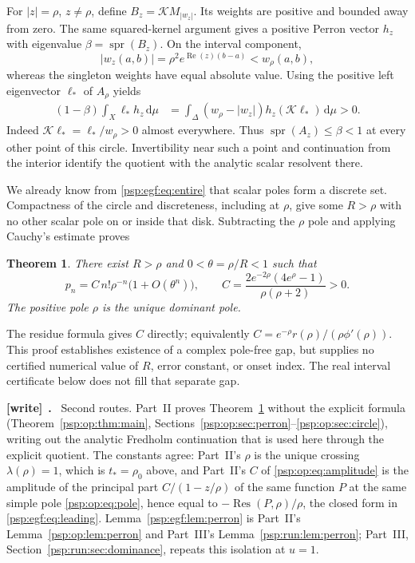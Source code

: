 \documentclass[11pt,letterpaper]{article}
\numberwithin{equation}{section}
\newtheorem{theorem}{Theorem}[section]
\theoremstyle{remark}\newtheorem{remark}[theorem]{Remark}
\newcommand{\dd}{\,\mathrm d}
\newcommand{\spr}{\operatorname{spr}}
\newcommand{\Res}{\operatorname{Res}}
\newenvironment{writenote}[1][]{\par\smallskip\begingroup\small
 \noindent\textbf{[write]}\if\relax\detokenize{#1}\relax\else~\textbf{#1.}\fi\ }%
 {\par\endgroup\smallskip}
\begin{document}
For $|z|=\rho$, $z\ne\rho$, define
$B_z=\mathcal K M_{|w_z|}$. Its weights are positive and bounded away
from zero. The same squared-kernel argument gives a positive Perron
vector $h_z$ with eigenvalue $\beta=\spr(B_z)$. On the interval component,
\[
 |w_z(a,b)|=\rho^2e^{\operatorname{Re}(z)(b-a)}<w_\rho(a,b),
\]
whereas the singleton weights have equal absolute value. Using the
positive left eigenvector $\ell_*$ of $A_\rho$ yields
\begin{align*}
 (1-\beta)\int_X\ell_*h_z\dd\mu
 &=\int_\Delta(w_\rho-|w_z|)h_z(\mathcal K\ell_*)\dd\mu>0.
\end{align*}
Indeed $\mathcal K\ell_*=\ell_*/w_\rho>0$ almost everywhere.
Thus $\spr(A_z)\leq\beta<1$ at every other point of this circle.
Invertibility near such a point and continuation from the interior
identify the quotient with the analytic scalar resolvent there.

We already know from \eqref{psp:egf:eq:entire} that scalar poles form a discrete
set. Compactness of the circle and discreteness, including at $\rho$,
give some $R>\rho$ with no other scalar pole on or inside that disk.
Subtracting the $\rho$ pole and applying Cauchy's estimate proves
\begin{theorem}\label{psp:egf:thm:leading}
There exist $R>\rho$ and $0<\theta=\rho/R<1$ such that
\begin{equation}\label{psp:egf:eq:leading}
 p_n=C\,n!\rho^{-n}\bigl(1+O(\theta^n)\bigr),\qquad
 C=\frac{2e^{-2\rho}(4e^\rho-1)}{\rho(\rho+2)}>0.
\end{equation}
The positive pole $\rho$ is the unique dominant pole.
\end{theorem}
The residue formula gives $C$ directly; equivalently
$C=e^{-\rho}r(\rho)/(\rho\phi'(\rho))$.
This proof establishes existence of a complex pole-free gap, but supplies
no certified numerical value of $R$, error constant, or onset index.
The real interval certificate below does not fill that separate gap.
\begin{writenote}
Second routes. Part~II proves Theorem~\ref{psp:egf:thm:leading} without the explicit formula (Theorem~\ref{psp:op:thm:main}, Sections~\ref{psp:op:sec:perron}--\ref{psp:op:sec:circle}), writing out the analytic Fredholm continuation that is used here through the explicit quotient. The constants agree: Part~II's $\rho$ is the unique crossing $\lambda(\rho)=1$, which is $t_*=\rho_0$ above, and Part~II's $C$ of \eqref{psp:op:eq:amplitude} is the amplitude of the principal part $C/(1-z/\rho)$ of the same function $P$ at the same simple pole \eqref{psp:op:eq:pole}, hence equal to $-\Res(P,\rho)/\rho$, the closed form in \eqref{psp:egf:eq:leading}. Lemma~\ref{psp:egf:lem:perron} is Part~II's Lemma~\ref{psp:op:lem:perron} and Part~III's Lemma~\ref{psp:run:lem:perron}; Part~III, Section~\ref{psp:run:sec:dominance}, repeats this isolation at $u=1$.
\end{writenote}
\end{document}
